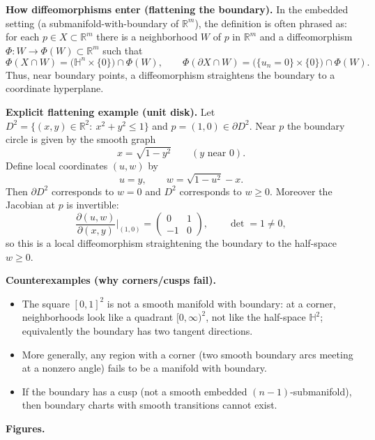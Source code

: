 \documentclass[12pt,a4paper]{article}
\theoremstyle{plain}
\theoremstyle{definition}      %
\begin{document}
\medskip
\noindent\textbf{How diffeomorphisms enter (flattening the boundary).}
In the embedded setting (a submanifold-with-boundary of $\mathbb{R}^m$), the definition is often phrased as:
for each $p\in X\subset\mathbb{R}^m$ there is a neighborhood $W$ of $p$ in $\mathbb{R}^m$ and a diffeomorphism
$\Phi:W\to \Phi(W)\subset\mathbb{R}^m$ such that
\[
\Phi(X\cap W)=\bigl(\mathbb{H}^n\times\{0\}\bigr)\cap \Phi(W),
\qquad
\Phi(\partial X\cap W)=\bigl(\{u_n=0\}\times\{0\}\bigr)\cap \Phi(W).
\]
Thus, near boundary points, a diffeomorphism straightens the boundary to a coordinate hyperplane.

\medskip
\noindent\textbf{Explicit flattening example (unit disk).}
Let $D^2=\{(x,y)\in\mathbb{R}^2:\ x^2+y^2\le 1\}$ and $p=(1,0)\in\partial D^2$.
Near $p$ the boundary circle is given by the smooth graph
\[
x=\sqrt{1-y^2}\qquad (y\text{ near }0).
\]
Define local coordinates $(u,w)$ by
\[
u=y,\qquad w=\sqrt{1-u^2}-x.
\]
Then $\partial D^2$ corresponds to $w=0$ and $D^2$ corresponds to $w\ge 0$.
Moreover the Jacobian at $p$ is invertible:
\[
\frac{\partial(u,w)}{\partial(x,y)}\Big|_{(1,0)}
=
\begin{pmatrix}
	0 & 1\\
	-1 & 0
\end{pmatrix},
\qquad \det=1\neq 0,
\]
so this is a local diffeomorphism straightening the boundary to the half-space $w\ge 0$.

\medskip
\noindent\textbf{Counterexamples (why corners/cusps fail).}
\begin{itemize}
	\item The square $[0,1]^2$ is not a smooth manifold with boundary: at a corner, neighborhoods look like a quadrant
	$[0,\infty)^2$, not like the half-space $\mathbb{H}^2$; equivalently the boundary has two tangent directions.
	\item More generally, any region with a corner (two smooth boundary arcs meeting at a nonzero angle) fails to be a manifold with boundary.
	\item If the boundary has a cusp (not a smooth embedded $(n-1)$-submanifold), then boundary charts with smooth transitions cannot exist.
\end{itemize}

\medskip
\noindent\textbf{Figures.}
\end{document}
